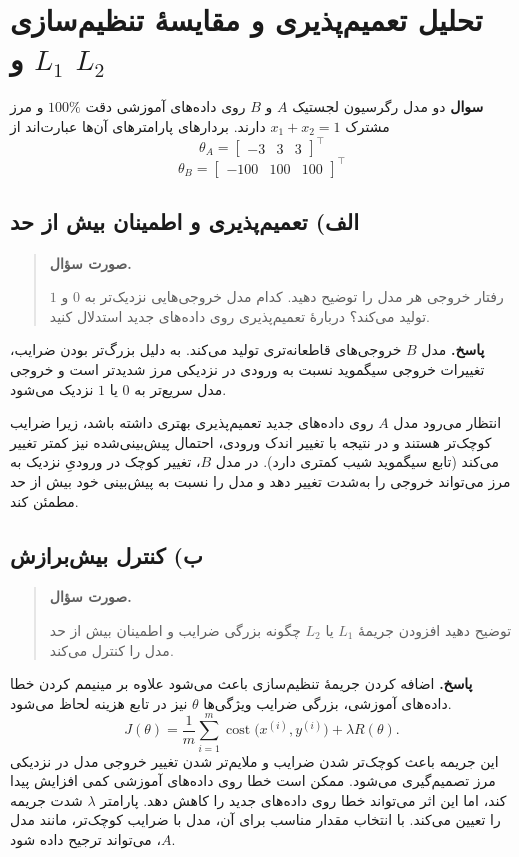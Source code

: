 \documentclass{article}
\numberwithin{equation}{section}
\numberwithin{table}{section}
\newenvironment{questionprompt}{%
    \begin{quote}\noindent\textbf{صورت سؤال.}\enspace\ignorespaces
}{%
    \end{quote}\noindent\textbf{پاسخ.}\enspace\ignorespacesafterend
}
\begin{document}
\section{تحلیل تعمیم‌پذیری و مقایسهٔ تنظیم‌سازی \(L_1\) و \(L_2\)}

\noindent\textbf{سوال}
دو مدل رگرسیون لجستیک \(A\) و \(B\) روی داده‌های آموزشی دقت \(100\%\) و مرز مشترک \(x_1+x_2=1\) دارند. بردارهای پارامترهای آن‌ها عبارت‌اند از
\[
    \theta_A=\begin{bmatrix}-3&3&3\end{bmatrix}^{\top}
\]
\[
  \theta_B=\begin{bmatrix}-100&100&100\end{bmatrix}^{\top}
\]

\subsection*{الف) تعمیم‌پذیری و اطمینان بیش از حد}
\begin{questionprompt}
    رفتار خروجی هر مدل را توضیح دهید. کدام مدل خروجی‌هایی نزدیک‌تر به \(0\) و \(1\) تولید می‌کند؟ دربارهٔ تعمیم‌پذیری روی داده‌های جدید استدلال کنید.
\end{questionprompt}
مدل \(B\) خروجی‌های قاطعانه‌تری تولید می‌کند. به دلیل بزرگ‌تر بودن ضرایب، تغییرات خروجی سیگموید نسبت به ورودی در نزدیکی مرز شدیدتر است و خروجی مدل سریع‌تر به \(0\) یا \(1\) نزدیک می‌شود.

انتظار می‌رود مدل \(A\) روی داده‌های جدید تعمیم‌پذیری بهتری داشته باشد، زیرا ضرایب کوچک‌تر هستند و در نتیجه با تغییر اندک ورودی، احتمال پیش‌بینی‌شده نیز کمتر تغییر می‌کند (تابع سیگموید شیب کمتری دارد). در مدل \(B\)، تغییر کوچک در ورودیِ نزدیک به مرز می‌تواند خروجی را به‌شدت تغییر دهد و مدل را نسبت به پیش‌بینی خود بیش از حد مطمئن کند.
\\
\subsection*{ب) کنترل بیش‌برازش}
\begin{questionprompt}
    توضیح دهید افزودن جریمهٔ \(L_1\) یا \(L_2\) چگونه بزرگی ضرایب و اطمینان بیش از حد مدل را کنترل می‌کند.
\end{questionprompt}
اضافه کردن جریمهٔ تنظیم‌سازی باعث می‌شود علاوه بر مینیمم کردن خطا داده‌های آموزشی، بزرگی ضرایب ویژگی‌ها \(\theta\) نیز در تابع هزینه لحاظ می‌شود.
\[
    J(\theta)=\frac1m\sum_{i=1}^{m}
      \operatorname{cost}\bigl(x^{(i)},y^{(i)}\bigr)+\lambda R(\theta).
\]
این جریمه باعث کوچک‌تر شدن ضرایب و ملایم‌تر شدن تغییر خروجی مدل در نزدیکی مرز تصمیم‌گیری می‌شود. ممکن است خطا روی داده‌های آموزشی کمی افزایش پیدا کند، اما این اثر می‌تواند خطا روی داده‌های جدید را کاهش دهد. پارامتر \(\lambda\) شدت جریمه را تعیین می‌کند. با انتخاب مقدار مناسب برای آن، مدل با ضرایب کوچک‌تر، مانند مدل \(A\)، می‌تواند ترجیح داده شود.
\\
\\
\end{document}
